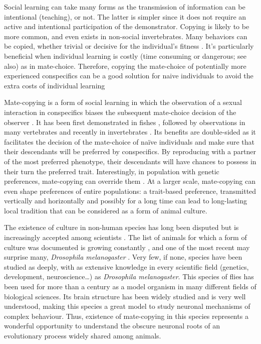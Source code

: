 \documentclass[a4paper, 12pt]{article}
\begin{document}
Social learning can take many forms as the transmission of information can be
intentional (teaching), or not. The latter is simpler since it does not require an active and intentional participation of the demonstrator. Copying is likely to be more common, and even exists in non-social invertebrates\parencite{coolen_social_2005, mark_how_2010}. Many behaviors can be copied, whether trivial \parencite{van_leeuwen_group-specific_2014} or decisive for the individual’s fitness \parencite{mery_public_2009}. It’s particularly beneficial when individual learning is costly (time consuming or dangerous; see also\parencite{webster_social_2008}) as in mate-choice. Therefore, copying the mate-choice of potentially more experienced conspecifics can be a good solution for naive individuals to avoid the extra costs of individual learning


Mate-copying is a form of social learning in which the observation of a sexual interaction in conspecifics biases the subsequent mate-choice decision of the observer \parencite{brown_fish_2011}. It has been first demonstrated in fishes \parencite{dugatkin_reversal_1992}, followed by observations in many vertebrates \parencite{galef_mate-choice_1998, yorzinski_same-sex_2010} and recently in invertebrates \parencite{mery_public_2009, fowler-finn_complexities_2015}. Its benefits are double-sided as it facilitates the decision of the mate-choice of naïve individuals and make sure that their descendants will be preferred by conspecifics. By reproducing with a partner of the most preferred phenotype, their descendants will have chances to possess in their turn the preferred trait.
Interestingly, in population with genetic preferences, mate-copying can override them \parencite{dugatkin_interface_1996, witte_male_1998}. At a larger scale, mate-copying can even shape preferences of entire populations: a trait-based preference, transmitted vertically and horizontally and possibly for a long time can lead to long-lasting local tradition that can be considered as a form of animal culture\parencite{brooks_importance_1998, danchin_cultural_2018}.

The existence of culture in non-human species has long been disputed \parencite{laland_animals_2003} but is increasingly accepted among scientists \parencite{aplin_experimentally_2015, whitehead_geneculture_2017}. The list of animals for which a form of culture was documented is growing constantly \parencite{van_schaik_orangutan_2003, thornton_multi_2010, whiten_culture_2017} , and one of the most recent may surprise many, \textit{Drosophila melanogaster} \parencite{danchin_cultural_2018}.  Very few, if none, species have been studied as deeply, with as extensive knowledge in every scientific field (genetics, development, neuroscience…) as \textit{Drosophila melanogaster}. This species of flies has been used for more than a century as a model organism in many different fields of biological sciences.  Its brain structure has been widely studied and is very well understood, making this species a great model to study neuronal mechanisms of complex behaviour. Thus, existence of mate-copying in this species represents a wonderful opportunity to understand the obscure neuronal roots of an evolutionary process widely shared among animals.  
\end{document}
